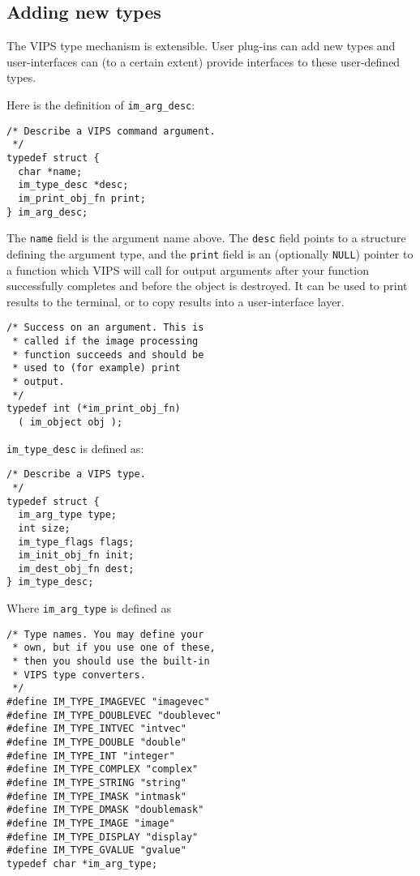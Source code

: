 \subsection{Adding new types}

The VIPS type mechanism is extensible. User plug-ins can add new types
and user-interfaces can (to a certain extent) provide interfaces to these
user-defined types.

Here is the definition of \verb+im_arg_desc+:

\begin{verbatim}
/* Describe a VIPS command argument.
 */
typedef struct {
  char *name;         
  im_type_desc *desc; 
  im_print_obj_fn print;
} im_arg_desc;
\end{verbatim}

The \verb+name+ field is the argument name above. The \verb+desc+ field
points to a structure defining the argument type, and the \verb+print+ field
is an (optionally \verb+NULL+) pointer to a function which VIPS will call
for output arguments after your function successfully completes and before
the object is destroyed. It can be used to print results to the terminal,
or to copy results into a user-interface layer.

\begin{verbatim}
/* Success on an argument. This is 
 * called if the image processing 
 * function succeeds and should be 
 * used to (for example) print 
 * output.
 */
typedef int (*im_print_obj_fn)
  ( im_object obj );
\end{verbatim}

\verb+im_type_desc+ is defined as:

\begin{verbatim}
/* Describe a VIPS type.
 */
typedef struct {
  im_arg_type type;    
  int size;         
  im_type_flags flags;
  im_init_obj_fn init;
  im_dest_obj_fn dest;
} im_type_desc;
\end{verbatim}

Where \verb+im_arg_type+ is defined as

\begin{verbatim}
/* Type names. You may define your 
 * own, but if you use one of these, 
 * then you should use the built-in 
 * VIPS type converters.
 */
#define IM_TYPE_IMAGEVEC "imagevec"
#define IM_TYPE_DOUBLEVEC "doublevec"
#define IM_TYPE_INTVEC "intvec"	
#define IM_TYPE_DOUBLE "double"
#define IM_TYPE_INT "integer"
#define IM_TYPE_COMPLEX "complex"
#define IM_TYPE_STRING "string" 
#define IM_TYPE_IMASK "intmask"
#define IM_TYPE_DMASK "doublemask"
#define IM_TYPE_IMAGE "image"    
#define IM_TYPE_DISPLAY "display"
#define IM_TYPE_GVALUE "gvalue"	
typedef char *im_arg_type;     
\end{verbatim}

